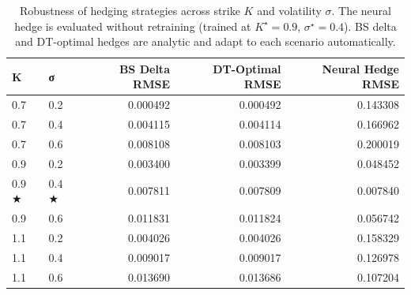 \begin{table}
\caption{Robustness of hedging strategies across strike $K$ and volatility $\sigma$. The neural hedge is evaluated without retraining (trained at $K^\star=0.9$, $\sigma^\star=0.4$). BS delta and DT-optimal hedges are analytic and adapt to each scenario automatically.}
\label{tab:robustness}
\begin{tabular}{llrrr}
\toprule
K & σ & BS Delta RMSE & DT-Optimal RMSE & Neural Hedge RMSE \\
\midrule
0.7 & 0.2 & 0.000492 & 0.000492 & 0.143308 \\
0.7 & 0.4 & 0.004115 & 0.004114 & 0.166962 \\
0.7 & 0.6 & 0.008108 & 0.008103 & 0.200019 \\
0.9 & 0.2 & 0.003400 & 0.003399 & 0.048452 \\
0.9 ★ & 0.4 ★ & 0.007811 & 0.007809 & 0.007840 \\
0.9 & 0.6 & 0.011831 & 0.011824 & 0.056742 \\
1.1 & 0.2 & 0.004026 & 0.004026 & 0.158329 \\
1.1 & 0.4 & 0.009017 & 0.009017 & 0.126978 \\
1.1 & 0.6 & 0.013690 & 0.013686 & 0.107204 \\
\bottomrule
\end{tabular}
\end{table}
